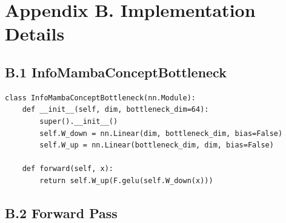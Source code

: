 \section{Appendix B. Implementation Details}

\subsection{B.1 InfoMambaConceptBottleneck}

\begin{lstlisting}
class InfoMambaConceptBottleneck(nn.Module):
    def __init__(self, dim, bottleneck_dim=64):
        super().__init__()
        self.W_down = nn.Linear(dim, bottleneck_dim, bias=False)
        self.W_up = nn.Linear(bottleneck_dim, dim, bias=False)
    
    def forward(self, x):
        return self.W_up(F.gelu(self.W_down(x)))
\end{lstlisting}

\subsection{B.2 Forward Pass}


